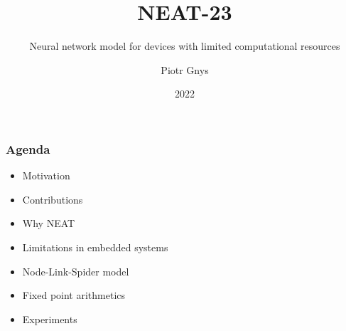\documentclass{beamer}
\title{NEAT-23}
\subtitle{Neural network model for devices with limited computational resources}
\author{Piotr Gnys}
\institute{Polish Japanese Academy of Information Technology}
\date{2022}
\begin{document}
\frame{\titlepage}

\begin{frame}
\frametitle{Agenda}
	\begin{itemize}
		\item Motivation
		\item Contributions
		\item Why NEAT
		\item Limitations in embedded systems
		\item Node-Link-Spider model
		\item Fixed point arithmetics
		\item Experiments
	\end{itemize}
\end{frame}
\end{document}
